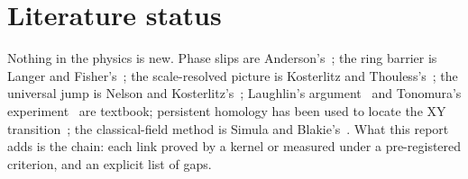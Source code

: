 \documentclass[11pt,a4paper]{article}
\begin{document}
\section{Literature status}
Nothing in the physics is new. Phase slips are Anderson's~\cite{Anderson1966}; the ring barrier is
Langer and Fisher's~\cite{LangerFisher1967}; the scale-resolved picture is Kosterlitz and
Thouless's~\cite{KosterlitzThouless1973}; the universal jump is Nelson and
Kosterlitz's~\cite{NelsonKosterlitz1977}; Laughlin's argument~\cite{Laughlin1981} and Tonomura's
experiment~\cite{Tonomura1986} are textbook; persistent homology has been used to locate the XY
transition~\cite{ColeLogesShiu2020}; the classical-field method is Simula and
Blakie's~\cite{SimulaBlakie2006}. What this report adds is the chain: each link proved by a kernel or
measured under a pre-registered criterion, and an explicit list of gaps.



\end{document}
